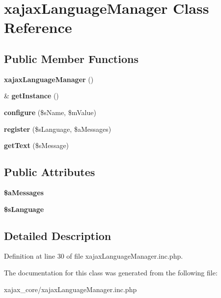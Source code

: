 \hypertarget{classxajaxLanguageManager}{
\section{xajaxLanguageManager Class Reference}
\label{classxajaxLanguageManager}
}
\subsection*{Public Member Functions}
\begin{DoxyCompactItemize}
\item 
\hypertarget{classxajaxLanguageManager_a4e3dcb70fcdcdb68b2b08f9a0223fce0}{
{\bfseries xajaxLanguageManager} ()}
\label{classxajaxLanguageManager_a4e3dcb70fcdcdb68b2b08f9a0223fce0}

\item 
\hypertarget{classxajaxLanguageManager_a11ca9714cf7c8a38235d92f1b53c296f}{
\& {\bfseries getInstance} ()}
\label{classxajaxLanguageManager_a11ca9714cf7c8a38235d92f1b53c296f}

\item 
\hypertarget{classxajaxLanguageManager_a036914bb02270854d83efd6deff61f75}{
{\bfseries configure} (\$sName, \$mValue)}
\label{classxajaxLanguageManager_a036914bb02270854d83efd6deff61f75}

\item 
\hypertarget{classxajaxLanguageManager_a3241c4978448eb5b0f9d16e415f5ce1d}{
{\bfseries register} (\$sLanguage, \$aMessages)}
\label{classxajaxLanguageManager_a3241c4978448eb5b0f9d16e415f5ce1d}

\item 
\hypertarget{classxajaxLanguageManager_a4ed65c8bfb35cf6055914df9277db654}{
{\bfseries getText} (\$sMessage)}
\label{classxajaxLanguageManager_a4ed65c8bfb35cf6055914df9277db654}

\end{DoxyCompactItemize}
\subsection*{Public Attributes}
\begin{DoxyCompactItemize}
\item 
\hypertarget{classxajaxLanguageManager_ab469fe35bb95c5f1a1d683c8a97b8d45}{
{\bfseries \$aMessages}}
\label{classxajaxLanguageManager_ab469fe35bb95c5f1a1d683c8a97b8d45}

\item 
\hypertarget{classxajaxLanguageManager_a390af99b4b3be651550b66bc7c4a0881}{
{\bfseries \$sLanguage}}
\label{classxajaxLanguageManager_a390af99b4b3be651550b66bc7c4a0881}

\end{DoxyCompactItemize}


\subsection{Detailed Description}


Definition at line 30 of file xajaxLanguageManager.inc.php.



The documentation for this class was generated from the following file:\begin{DoxyCompactItemize}
\item 
xajax\_\-core/xajaxLanguageManager.inc.php\end{DoxyCompactItemize}

